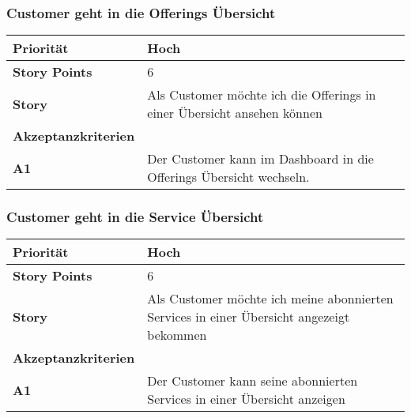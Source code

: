  \subsubsection{Customer geht in die Offerings Übersicht}
\begin{tabularx}{\linewidth}{l X}
  \textbf{Priorität} & Hoch\\
  \hline
  \textbf{Story Points} & 6\\
  \hline
  \textbf{Story}& Als Customer möchte ich die Offerings in einer Übersicht ansehen können\\
  \hline
    \textbf{Akzeptanzkriterien} & \\
    \hline
  \textbf{A1} & Der Customer kann im Dashboard in die Offerings Übersicht wechseln.\\
  \hline
   \end{tabularx}
   
 \subsubsection{Customer geht in die Service Übersicht}
\begin{tabularx}{\linewidth}{l X}
  \textbf{Priorität} & Hoch\\
  \hline
  \textbf{Story Points} & 6\\
  \hline
  \textbf{Story}& Als Customer möchte ich meine abonnierten Services in einer Übersicht angezeigt bekommen\\
  \hline
    \textbf{Akzeptanzkriterien} & \\
    \hline
  \textbf{A1} & Der Customer kann seine abonnierten Services in einer Übersicht anzeigen\\
  \hline
   \end{tabularx}
   